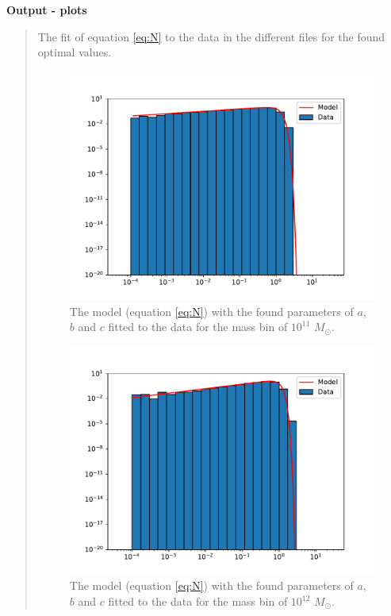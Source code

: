 \textbf{Output - plots}
\begin{quote}
The fit of equation \ref{eq:N} to the data in the different files for the found optimal values. 

\begin{figure}[!h]
\centering
\includegraphics[scale=0.7]{plots/satgals_m11.pdf}
\caption{The model (equation \ref{eq:N}) with the found parameters of $a$, $b$ and $c$ fitted to the data for the mass bin of $10^{11}$ $M_{\odot}$.}

\end{figure}
\begin{figure}[!hb]
\centering
\includegraphics[scale=0.7]{plots/satgals_m12.pdf}
\caption{The model (equation \ref{eq:N}) with the found parameters of $a$, $b$ and $c$ fitted to the data for the mass bin of $10^{12}$ $M_{\odot}$.}


\end{figure}
\end{quote}
